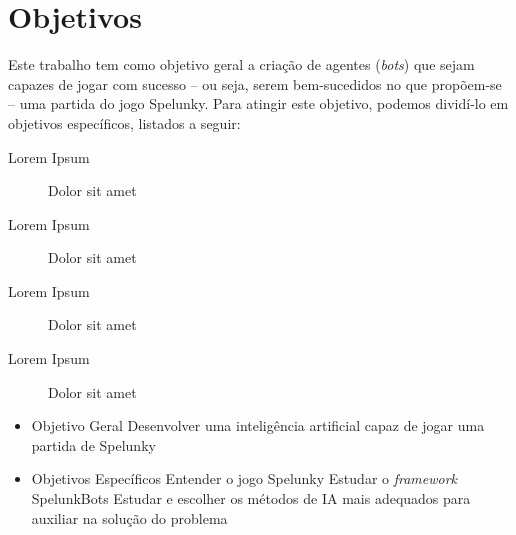 \chapter{\label{chap:objectives}Objetivos}
Este trabalho tem como objetivo geral a criação de agentes (\textit{bots})
que sejam capazes de jogar com sucesso -- ou seja, serem bem-sucedidos no que
propõem-se -- uma partida do jogo Spelunky. Para atingir este objetivo, podemos
dividí-lo em objetivos específicos, listados a seguir:

\begin{description}
    \item [Lorem Ipsum]
        Dolor sit amet
    \item [Lorem Ipsum]
        Dolor sit amet
    \item [Lorem Ipsum]
        Dolor sit amet
    \item [Lorem Ipsum]
        Dolor sit amet
\end{description}

\begin{itemize}
    \item Objetivo Geral
        \subitem Desenvolver uma inteligência artificial capaz de jogar uma partida de Spelunky
    \item Objetivos Específicos
        \subitem Entender o jogo Spelunky
        \subitem Estudar o \textit{framework} SpelunkBots
        \subitem Estudar e escolher os métodos de IA mais adequados para auxiliar na solução do problema
\end{itemize}
